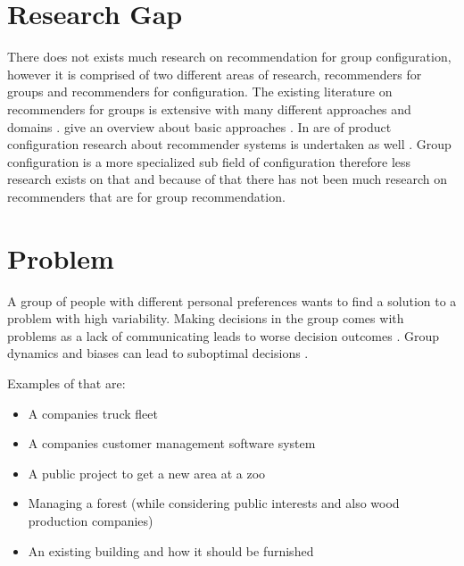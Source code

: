 
\section{Research Gap}

There does not exists much research on recommendation for group configuration, however it is comprised of two different areas of research, recommenders for groups and recommenders for configuration.
The existing literature on recommenders for groups is extensive with many different approaches and domains \cite{delicResearchMethodsGroup2016, chenInterfaceInteractionDesign2011, atasItemRecommendationUsing2017, jamesonRecommendationGroups2007, chenEmpatheticonsDesigningEmotion2014, liuCGSPAComprehensiveGroup2019}. \citeauthor{felfernigGroupRecommenderSystems2018} give an overview about basic approaches \cite{felfernigGroupRecommenderSystems2018}.
In are of product configuration research about recommender systems is undertaken as well \cite{pereiraFeaturebasedPersonalizedRecommender2016, scholzConfigurationbasedRecommenderSystem2017, scholzEffectsDecisionSpace2017}.
Group configuration is a more specialized sub field of configuration therefore less research exists on that and because of that there has not been much research on recommenders that are for group recommendation. 


\section{Problem}
A group of people with different personal preferences wants to find a solution to a problem with high variability. Making decisions in the group comes with problems as a lack of communicating leads to worse decision outcomes \cite{atasItemRecommendationUsing2017}. Group dynamics and biases can lead to suboptimal decisions \cite{kerrBiasJudgmentComparing1996}. 

Examples of that are:
\begin{itemize}
    \item A companies truck fleet
    \item A companies customer management software system
    \item A public project to get a new area at a zoo
    \item Managing a forest (while considering public interests and also wood production companies)
    \item An existing building and how it should be furnished
\end{itemize}

